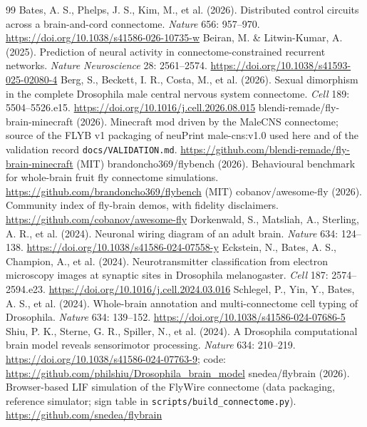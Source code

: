 \documentclass[11pt,a4paper]{article}
\begin{document}
\begin{thebibliography}{99}
\footnotesize
{} Bates, A. S., Phelps, J. S., Kim, M., et al. (2026).
Distributed control circuits across a brain-and-cord connectome.
\emph{Nature} 656: 957--970. \url{https://doi.org/10.1038/s41586-026-10735-w}
 Beiran, M. \& Litwin-Kumar, A. (2025). Prediction of
neural activity in connectome-constrained recurrent networks. \emph{Nature
Neuroscience} 28: 2561--2574. \url{https://doi.org/10.1038/s41593-025-02080-4}
 Berg, S., Beckett, I. R., Costa, M., et al. (2026). Sexual
dimorphism in the complete Drosophila male central nervous system connectome.
\emph{Cell} 189: 5504--5526.e15.
\url{https://doi.org/10.1016/j.cell.2026.08.015}
 blendi-remade/fly-brain-minecraft (2026). Minecraft mod driven
by the MaleCNS connectome; source of the FLYB v1 packaging of neuPrint
male-cns:v1.0 used here and of the validation record
\texttt{docs/VALIDATION.md}.
\url{https://github.com/blendi-remade/fly-brain-minecraft} (MIT)
 brandoncho369/flybench (2026). Behavioural benchmark for
whole-brain fruit fly connectome simulations.
\url{https://github.com/brandoncho369/flybench} (MIT)
 cobanov/awesome-fly (2026). Community index of fly-brain
demos, with fidelity disclaimers. \url{https://github.com/cobanov/awesome-fly}
 Dorkenwald, S., Matsliah, A., Sterling, A. R., et al.
(2024). Neuronal wiring diagram of an adult brain. \emph{Nature} 634:
124--138. \url{https://doi.org/10.1038/s41586-024-07558-y}
 Eckstein, N., Bates, A. S., Champion, A., et al.
(2024). Neurotransmitter classification from electron microscopy images at
synaptic sites in Drosophila melanogaster. \emph{Cell} 187: 2574--2594.e23.
\url{https://doi.org/10.1016/j.cell.2024.03.016}
 Schlegel, P., Yin, Y., Bates, A. S., et al. (2024).
Whole-brain annotation and multi-connectome cell typing of Drosophila.
\emph{Nature} 634: 139--152. \url{https://doi.org/10.1038/s41586-024-07686-5}
 Shiu, P. K., Sterne, G. R., Spiller, N., et al. (2024). A
Drosophila computational brain model reveals sensorimotor processing.
\emph{Nature} 634: 210--219. \url{https://doi.org/10.1038/s41586-024-07763-9};
code: \url{https://github.com/philshiu/Drosophila_brain_model}
 snedea/flybrain (2026). Browser-based LIF simulation of the
FlyWire connectome (data packaging, reference simulator; sign table in
\texttt{scripts/build\_connectome.py}). \url{https://github.com/snedea/flybrain}

\end{thebibliography}
\end{document}
